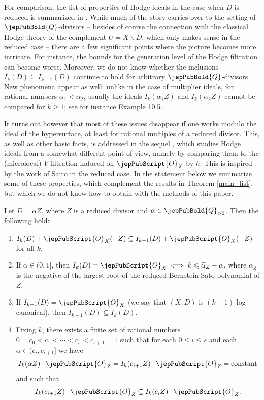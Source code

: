 For comparison, the list of properties of Hodge ideals in the case when $D$ is reduced is summarized in \cite[\S4]{Popa}. While much of the story carries over to the setting of $\jepPubBold{Q}$-divisors -- besides of course the connection with the classical Hodge theory of the complement $U = X \smallsetminus D$, which only makes sense in the reduced case -- there are a few significant points where the picture becomes more intricate. For instance, the bounds for the generation level of the Hodge filtration can become worse.  
Moreover, we do not know 
whether the inclusions $I_k (D) \subseteq I_{k-1} (D)$ continue to hold for arbitrary $\jepPubBold{Q}$-divisors. New phenomena appear as well: unlike in the case of multiplier ideals, for 
rational numbers $\alpha_1 < \alpha_2$, usually the ideals $I_k (\alpha_1 Z)$ and $I_k (\alpha_2 Z)$ cannot be 
compared for $k \geqslant 1$; see for instance Example 10.5.

It turns out however that most of these issues disappear if one works modulo the ideal of the hypersurface, at least for 
rational multiples of a reduced divisor.
This, as well as other basic facts, is addressed in the sequel \cite{MP3}, which 
studies Hodge ideals from a somewhat different point of view, namely by comparing them to
the (microlocal) $V$-filtration induced on $\jepPubScript{O}_X$ by $h$. This is inspired by the work of Saito \cite{Saito-MLCT} in the reduced case. In the statement below we summarize some of these properties, which complement the results in Theorem \ref{main_list}, but which we do not know how to obtain with the methods of this paper.


\begin{intro-theorem}[\cite{MP3}]\label{other_paper}
Let $D = \alpha Z$, where $Z$ is a reduced divisor and $\alpha \in \jepPubBold{Q}_{> 0}$. Then the following hold:
\begin{enumerate}[label=(\arabic*)]
\item $I_k (D) + \jepPubScript{O}_X(-Z) \subseteq I_{k-1} (D) + \jepPubScript{O}_X(-Z)$ for all $k$.
\item If $\alpha \in (0 , 1]$, then $I_k (D) = \jepPubScript{O}_X \iff k \leqslant \widetilde{\alpha}_Z - \alpha$, where 
$\widetilde{\alpha}_Z$  is the negative of the largest root of the reduced Bernstein-Sato polynomial of $Z$.
\item If $I_{k-1}(D) = \jepPubScript{O}_X$ (we say that $(X, D)$ is $(k-1)$-log canonical),
then $I_{k+1} (D) \subseteq I_k (D)$.
\item Fixing $k$, there exists a finite set of rational numbers $0 = c_0 < c_1 < \cdots < c_s < c_{s+1} = 1$ such that 
for each $0 \leqslant i \leqslant s$ and each $\alpha \in (c_i, c_{i+1}]$ we have 
$$I_k (\alpha Z)\cdot\jepPubScript{O}_Z = I_k (c_{i+1} Z)\cdot\jepPubScript{O}_Z = \text{constant}$$
and such that 
$$I_k (c_{i+1} Z)\cdot\jepPubScript{O}_Z\subsetneq I_k (c_i Z)\cdot\jepPubScript{O}_Z.$$
\end{enumerate}
\end{intro-theorem}

